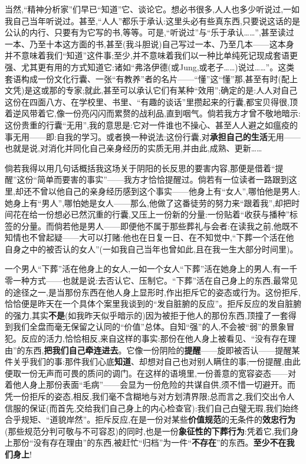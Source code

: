 当然,“精神分析家”们早已“知道”它、谈论它。想必书很多,人人也多少听说过,一如我自己当年听说过。甚至,“人人”都乐于承认:这里头必有些真东西,只要说这话的是公认的内行、只要有为它写的书,等等。可是,“听说过”与“乐于承认……”,甚至读过一本、\dmark{}乃至十本这方面的书,甚至(我斗胆说)自己写过一本、乃至几本——这本身并不意味着我们“知道”这件事;至少,并不意味着我们以一种比单纯死记现成套语更强、尤其更有用的方式知道它:诸如“弗洛伊德(或Jung,或老子……)说过……”。这类套语构成一份文化行囊、一张“有教养”者的名片——“懂”这“懂”那,甚至有时(配上文凭)是这或那的专家;就此,甚至可以承认它们有某种“效用”;确定的是:人人对自己这份在四面八方、在学校里、书里、“有趣的谈话”里攒起来的行囊,都宝贝得很,顶着逆风带着它,像一份亮闪闪而累赘的战利品,直到咽气。倘若我方才曾不敬地暗示:这份贵重的行囊“无用”,我的意思是:它对一件谁也不操心、甚至人人避之如瘟疫的事无用——即:自我的学习。或者换一种说法:这份行囊,对\textbf{承担自己的生活}无用——也就是说,对消化并同化自己亲身经历的实质无用,并由此,成熟、更新……

倘若我得以用几句话概括我这场关于阴阳的长反思的要害内容,那便是借着“提醒”这份“简单而要害的事实”——我方才恰恰提醒过。倘若有一位读者一路跟到这里,却还不曾以他自己的亲身经历感到这个事实——他身上有“女人”,哪怕他是男人;她身上有“男人”,哪怕她是女人——那么,他做了这番徒劳的努力来“跟着我”,却把时间花在给一份想必已然沉重的行囊,又压上一份新的分量:一份贴着“收获与播种”标签的分量。而倘若他是男人——即便他不属于那些葬礼与会者:在读我之前,他既不知情也不曾起疑——大可以打赌:他也在日复一日、在不知觉中,“下葬一个活在他自身之中的被否认的女人”(一如我自己当年也曾如此,且在我一生大部分时间里)。

一个男人“下葬”活在他身上的女人,一如一个女人“下葬”活在她身上的男人,有一千零一种方式——也就是说:去否认它、压制它。\dmark{}“下葬”活在自己身上的东西,最常见的途径之一,是当那份东西在他人身上显形时,作出拒斥它的姿态或行为。这份拒斥,恰恰便是昨天在一个具体个案里我谈到的“发自脏腑的反应”。拒斥反应的发自脏腑的强力,其实\textbf{不是}(如我昨天似乎暗示的)因为被拒于他人的那份东西,顶撞了一套得到我们全盘而毫无保留之认同的“价值”总体。自知“强”的人,不会被“弱”的景象冒犯。反应的活力,恰恰相反,来自这样的事实:那份在他人身上被看见、“没有存在理由”的东西,\textbf{把我们自己牵连进去}。它像一份阴险的\textbf{提醒}——旋即被否认——提醒某件关乎我们的事:那件我们心底\textbf{知道}、却想对自己也对别人瞒住的事;一份提醒,由此便取一份无声而可畏的质问的调门。在这样的语境里,一份善意的宽容姿态——对着他人身上那份表面“毛病”——会显为一份危险的共谋自供,须不惜一切避开。而凭一份拒斥的姿态,相反,我们毫不含糊地与对方划清界限;总而言之,我们交出令人信服的保证(而首先,交给我们自己身上的内心检查官):我们自己白璧无瑕,我们始终合乎规矩、“道貌岸然”。拒斥反应,在是一份对某些\textbf{价值规范}的无条件的\textbf{效忠行为}(那些规范分判可敬与不可容忍)的同时,也是一份\textbf{象征性的下葬行为}:凭着它,我们身上那份“没有存在理由”的东西,被赶忙“归档”为一件“\textbf{不存在}”的东西。\textbf{至少不在我们身上}!

